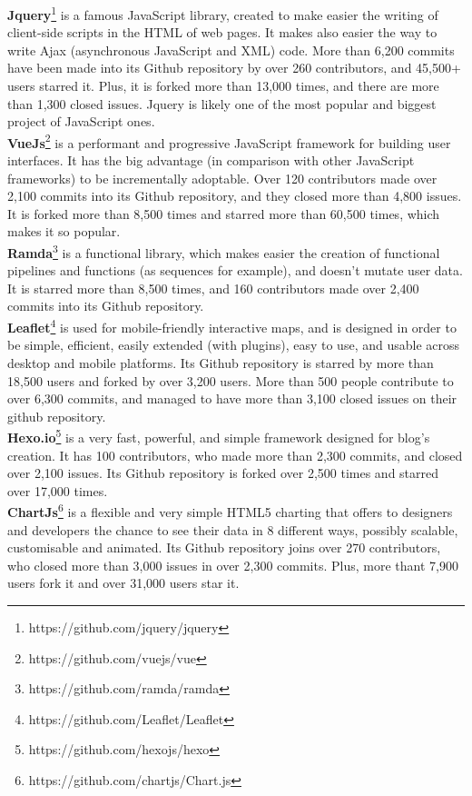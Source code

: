 {\color{blue}
\textbf{Jquery}\footnote{https://github.com/jquery/jquery} is a famous JavaScript library, created to make easier the writing of client-side scripts in the HTML of web pages. It makes also easier the way to write Ajax (asynchronous JavaScript and XML) code. More than 6,200 commits have been made into its Github repository by over 260 contributors, and 45,500+ users starred it. Plus, it is forked more than 13,000 times, and there are more than 1,300 closed issues. Jquery is likely one of the most popular and biggest project of JavaScript ones.\\
\textbf{VueJs}\footnote{https://github.com/vuejs/vue} is a performant and progressive JavaScript framework for building user interfaces. It has the big advantage (in comparison with other JavaScript frameworks) to be incrementally adoptable. Over 120 contributors made over 2,100 commits into its Github repository, and they closed more than 4,800 issues. It is forked more than 8,500 times and starred more than 60,500 times, which makes it so popular.\\
\textbf{Ramda}\footnote{https://github.com/ramda/ramda} is a functional library, which makes easier the creation of functional pipelines and functions (as sequences for example), and doesn't mutate user data. It is starred more than 8,500 times, and 160 contributors made over 2,400 commits into its Github repository.\\
\textbf{Leaflet}\footnote{https://github.com/Leaflet/Leaflet} is used for mobile-friendly interactive maps, and is designed in order to be simple, efficient, easily extended (with plugins), easy to use, and usable across desktop and mobile platforms. Its Github repository is starred by more than 18,500 users and forked by over 3,200 users. More than 500 people contribute to over 6,300 commits, and managed to have more than 3,100 closed issues on their github repository.\\
\textbf{Hexo.io}\footnote{https://github.com/hexojs/hexo} is a very fast, powerful, and simple framework designed for blog's creation. It has 100 contributors, who made more than 2,300 commits, and closed over 2,100 issues. Its Github repository is forked over 2,500 times and starred over 17,000 times.\\
\textbf{ChartJs}\footnote{https://github.com/chartjs/Chart.js} is a flexible and very simple HTML5 charting that offers to designers and developers the chance to see their data in 8 different ways, possibly scalable, customisable and animated. Its Github repository joins over 270 contributors, who closed more than 3,000 issues in over 2,300 commits. Plus, more thant 7,900 users fork it and over 31,000 users star it.\\
}
